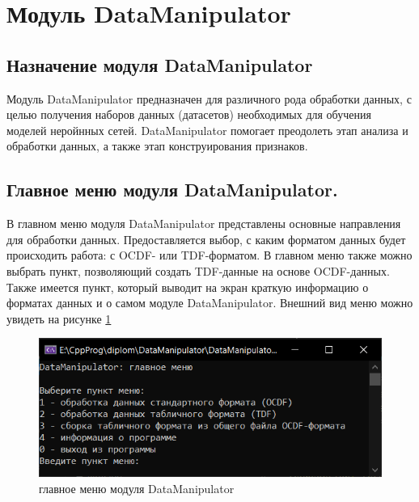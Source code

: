 \sectionbreak \section{ \standartTitleFont
  Модуль DataManipulator
}

\subsection{ \standartTitleFont
  Назначение модуля DataManipulator
}

{\standartFont

  \par Модуль DataManipulator предназначен для различного рода обработки данных, с целью получения наборов данных (датасетов) необходимых для обучения моделей неройнных сетей. DataManipulator помогает преодолеть этап анализа и обработки данных, а также этап конструирования признаков.

  \par
}

\subsection{ \standartTitleFont
  Главное меню модуля DataManipulator.
}

{\standartFont

  \par В главном меню модуля DataManipulator представлены основные направления для обработки данных. Предоставляется выбор, с каким форматом данных будет происходить работа: с OCDF- или TDF-форматом. В главном меню также можно выбрать пункт, позволяющий создать TDF-данные на основе OCDF-данных. Также имеется пункт, который выводит на экран краткую информацию о форматах данных и о самом модуле DataManipulator. Внешний вид меню можно увидеть на рисунке \ref{fig:mainMenu}

  \par

  \begin{figure}[H]
    \centering
    \includegraphics{images/forDataManipulator/mainMenu.png}
    \caption{главное меню модуля DataManipulator}
    \label{fig:mainMenu}
  \end{figure}

}

